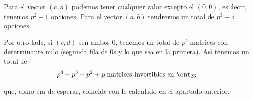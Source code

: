 \begin{example}
\begin{itemize}
Para el vector $(c,d)$ podemos tener cualquier valor excepto el $(0,0)$, es decir, tenemos $p^2 -1$ opciones. Para el vector $(a,b)$ tendremos un total de $p^3-p$ opciones.

Por otro lado, si $(c,d)$ son ambos $0$, tenemos un total de $p^2$ matrices con determinante nulo (segunda fila de 0s y lo que sea en la primera). Así tenemos un total de
\[p^4 - p^3 -p^2+p \text{ matrices invertibles en } \ent_{26}\]

que, como era de esperar, coincide con lo calculado en el apartado anterior.

\end{itemize}
\end{example}